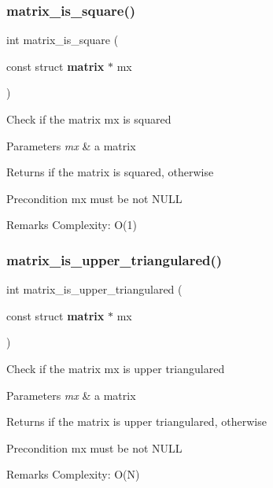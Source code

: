 \subsubsection{matrix\+\_\+is\+\_\+square()}
{\footnotesize\ttfamily int matrix\+\_\+is\+\_\+square (\begin{DoxyParamCaption}\item[{const struct \textbf{ matrix} $\ast$}]{mx }\end{DoxyParamCaption})\hspace{0.3cm}{\ttfamily [inline]}}

Check if the matrix {\ttfamily mx} is squared


\begin{DoxyParams}{Parameters}
{\em mx} & a matrix \\
\hline
\end{DoxyParams}
\begin{DoxyReturn}{Returns}
{} if the matrix is squared, {} otherwise
\end{DoxyReturn}
\begin{DoxyPrecond}{Precondition}
{\ttfamily mx} must be not N\+U\+LL
\end{DoxyPrecond}
\begin{DoxyRemark}{Remarks}
Complexity\+: O(1) 
\end{DoxyRemark}
\mbox{\label{matrix_8h_ae3a4575aa2b0493bbf0b7bee70d30f07}} 
\subsubsection{matrix\+\_\+is\+\_\+upper\+\_\+triangulared()}
{\footnotesize\ttfamily int matrix\+\_\+is\+\_\+upper\+\_\+triangulared (\begin{DoxyParamCaption}\item[{const struct \textbf{ matrix} $\ast$}]{mx }\end{DoxyParamCaption})\hspace{0.3cm}{\ttfamily [inline]}}

Check if the matrix {\ttfamily mx} is upper triangulared


\begin{DoxyParams}{Parameters}
{\em mx} & a matrix \\
\hline
\end{DoxyParams}
\begin{DoxyReturn}{Returns}
{} if the matrix is upper triangulared, {} otherwise
\end{DoxyReturn}
\begin{DoxyPrecond}{Precondition}
{\ttfamily mx} must be not N\+U\+LL
\end{DoxyPrecond}
\begin{DoxyRemark}{Remarks}
Complexity\+: O(\+N) 
\end{DoxyRemark}
\mbox{\label{matrix_8h_a41f40f546c465fd096679a7f94ea5e8b}} 
